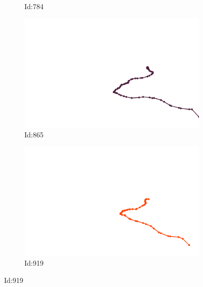\documentclass[12pt,twoside]{report}
\begin{document}
\begin{figure}
\begin{subfigure}[b]{0.20\textwidth}
\caption{Id:784}
\end{subfigure}
\begin{subfigure}[b]{0.20\textwidth}
\centering
\includegraphics[width=\textwidth]{../../trajectories/865.png}
\caption{Id:865}
\end{subfigure}
\begin{subfigure}[b]{0.20\textwidth}
\centering
\includegraphics[width=\textwidth]{../../trajectories/919.png}
\caption{Id:919}
\end{subfigure}
\end{figure}
\end{document}
